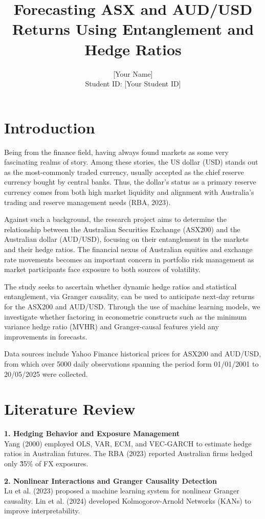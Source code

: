 \documentclass[11pt,a4paper]{article}
\title{Forecasting ASX and AUD/USD Returns Using Entanglement and Hedge Ratios}
\author{[Your Name] \\ Student ID: [Your Student ID]}
\date{}
\begin{document}
\maketitle

\section{Introduction}
Being from the finance field, having always found markets as some very fascinating realms of story. Among these stories, the US dollar (USD) stands out as the most-commonly traded currency, usually accepted as the chief reserve currency bought by central banks. Thus, the dollar’s status as a primary reserve currency comes from both high market liquidity and alignment with Australia's trading and reserve management needs (RBA, 2023). 

Against such a background, the research project aims to determine the relationship between the Australian Securities Exchange (ASX200) and the Australian dollar (AUD/USD), focusing on their entanglement in the markets and their hedge ratios. The financial nexus of Australian equities and exchange rate movements becomes an important concern in portfolio risk management as market participants face exposure to both sources of volatility.

The study seeks to ascertain whether dynamic hedge ratios and statistical entanglement, via Granger causality, can be used to anticipate next-day returns for the ASX200 and AUD/USD. Through the use of machine learning models, we investigate whether factoring in econometric constructs such as the minimum variance hedge ratio (MVHR) and Granger-causal features yield any improvements in forecasts.

Data sources include Yahoo Finance historical prices for ASX200 and AUD/USD, from which over 5000 daily observations spanning the period form 01/01/2001 to 20/05/2025  were collected.

\section{Literature Review}
\textbf{1. Hedging Behavior and Exposure Management} \\
Yang (2000) employed OLS, VAR, ECM, and VEC-GARCH to estimate hedge ratios in Australian futures. The RBA (2023) reported Australian firms hedged only \~35\% of FX exposures.

\textbf{2. Nonlinear Interactions and Granger Causality Detection} \\
Lu et al. (2023) proposed a machine learning system for nonlinear Granger causality. Lin et al. (2024) developed Kolmogorov-Arnold Networks (KANs) to improve interpretability.
\end{document}
